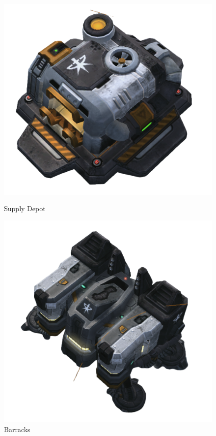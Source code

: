 \documentclass[12pt,a4paper]{article}
\begin{document}
\begin{figure}
    \includegraphics[width=\linewidth]{Figures/depot.png}
    \caption{Supply Depot}\label{fig:depot}
    \endminipage\hfill
    \includegraphics[width=\linewidth]{Figures/barracks.png}
    \caption{Barracks}\label{fig:barracks}

\end{figure}
\end{document}
